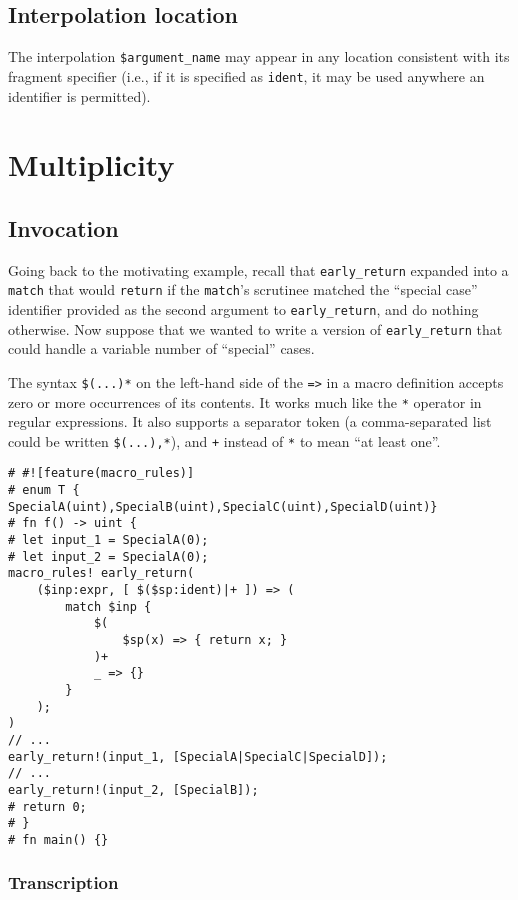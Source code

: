 \documentclass[]{article}
\begin{document}
\subsection{Interpolation location}\label{interpolation-location}

The interpolation \texttt{\$argument\_name} may appear in any location
consistent with its fragment specifier (i.e., if it is specified as
\texttt{ident}, it may be used anywhere an identifier is permitted).

\section{Multiplicity}\label{multiplicity}

\subsection{Invocation}\label{invocation}

Going back to the motivating example, recall that \texttt{early\_return}
expanded into a \texttt{match} that would \texttt{return} if the
\texttt{match}'s scrutinee matched the ``special case'' identifier
provided as the second argument to \texttt{early\_return}, and do
nothing otherwise. Now suppose that we wanted to write a version of
\texttt{early\_return} that could handle a variable number of
``special'' cases.

The syntax \texttt{\$(...)*} on the left-hand side of the
\texttt{=\textgreater{}} in a macro definition accepts zero or more
occurrences of its contents. It works much like the \texttt{*} operator
in regular expressions. It also supports a separator token (a
comma-separated list could be written \texttt{\$(...),*}), and
\texttt{+} instead of \texttt{*} to mean ``at least one''.

\begin{verbatim}
# #![feature(macro_rules)]
# enum T { SpecialA(uint),SpecialB(uint),SpecialC(uint),SpecialD(uint)}
# fn f() -> uint {
# let input_1 = SpecialA(0);
# let input_2 = SpecialA(0);
macro_rules! early_return(
    ($inp:expr, [ $($sp:ident)|+ ]) => (
        match $inp {
            $(
                $sp(x) => { return x; }
            )+
            _ => {}
        }
    );
)
// ...
early_return!(input_1, [SpecialA|SpecialC|SpecialD]);
// ...
early_return!(input_2, [SpecialB]);
# return 0;
# }
# fn main() {}
\end{verbatim}

\subsubsection{Transcription}\label{transcription}
\end{document}

